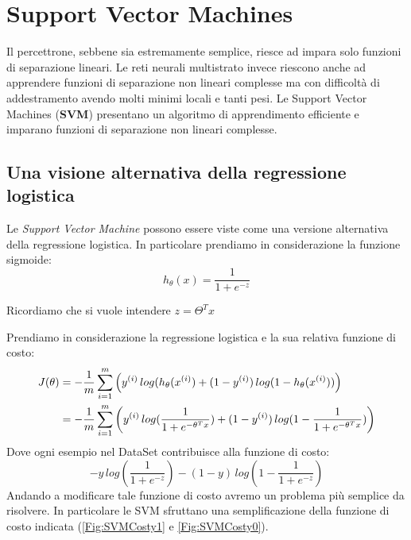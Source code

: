 \chapter{Support Vector Machines}
Il percettrone, sebbene sia estremamente semplice, riesce ad impara solo funzioni di separazione lineari. Le reti neurali multistrato invece riescono anche ad apprendere funzioni di separazione non lineari complesse ma con
difficoltà di addestramento avendo molti minimi locali e tanti pesi. Le Support Vector Machines (\textbf{SVM}) presentano un algoritmo di apprendimento efficiente e imparano funzioni di
separazione non lineari complesse.
\section{Una visione alternativa della regressione logistica}
Le \textit{Support Vector Machine} possono essere viste come una versione alternativa della regressione logistica. In particolare prendiamo in considerazione la funzione sigmoide:
\[h_\theta(x) = \frac {1} {1 + e^{-z}}\]
\begin{nota}
Ricordiamo che si vuole intendere $z = \Theta^T x$
\end{nota}
Prendiamo in considerazione la regressione logistica e la sua relativa funzione di costo:
\begin{align*}
J(\theta) &= -{1 \over m} \sum_{i=1}^m \left( y^{(i)}\,log(h_\theta(x^{(i)}) + (1-y^{(i)})\,log(1 - h_\theta(x^{(i)})) \right) \\
    &= -{1 \over m} \sum_{i=1}^m \left( y^{(i)}\,log(\frac {1} {1 + e^{-\theta^T x}}) + (1-y^{(i)})\,log(1 - \frac {1} {1 + e^{-\theta^T x}}) \right)
\end{align*} %
Dove ogni esempio nel DataSet contribuisce alla funzione di costo:
\[-y\,log(\frac {1} {1 + e^{-z}}) - (1-y)\,log(1 - \frac {1} {1 + e^{-z}})\]
Andando a modificare tale funzione di costo avremo un problema più semplice da risolvere. In particolare le SVM sfruttano una semplificazione della funzione di costo indicata (\ref{Fig:SVMCosty1} e \ref{Fig:SVMCosty0}).
